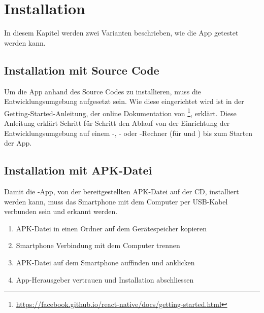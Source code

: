 \chapter{Installation}
\label{pd-installation}

In diesem Kapitel werden zwei Varianten beschrieben, wie die App getestet werden kann. 


\section{Installation mit Source Code}
Um die App anhand des Source Codes zu installieren, muss die  Entwicklungsumgebung aufgesetzt sein. 
Wie diese eingerichtet wird ist in der Getting-Started-Anleitung, der online Dokumentation von \footnote{\url{https://facebook.github.io/react-native/docs/getting-started.html}}, erklärt.
Diese Anleitung erklärt Schritt für Schritt den Ablauf von der Einrichtung der Entwicklungsumgebung auf einem -, - oder -Rechner (für  und ) bis zum Starten der App.

\section{Installation mit APK-Datei}
Damit die -App, von der bereitgestellten APK-Datei auf der CD, installiert werden kann, muss das Smartphone mit dem Computer per USB-Kabel verbunden sein und erkannt werden. 

\begin{enumerate}
	\item APK-Datei in einen Ordner auf dem Gerätespeicher kopieren
	\item Smartphone Verbindung mit dem Computer trennen
	\item APK-Datei auf dem Smartphone auffinden und anklicken
	\item App-Herausgeber vertrauen und Installation abschliessen
\end{enumerate}
